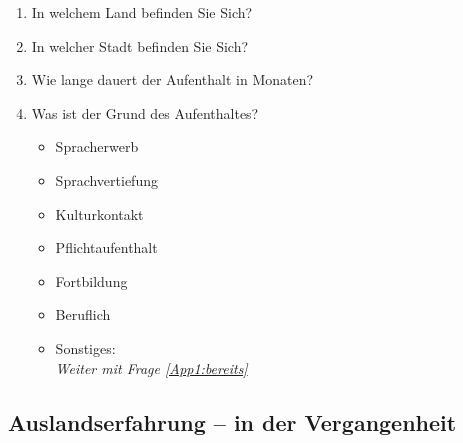 
\begin{enumerate}[resume]
\item In welchem Land befinden Sie Sich?\\\label{App1:ggnw}
	   \underline{\hspace{7.5cm}}


\item In welcher Stadt befinden Sie Sich?\\
	   \underline{\hspace{7.5cm}}


\item Wie lange dauert der Aufenthalt in Monaten?\\
	   \underline{\hspace{7.5cm}}
       
       
\item Was ist der Grund des Aufenthaltes?

		\begin{itemize}
		\item[\Circle] Spracherwerb 
        \item[\Circle] Sprachvertiefung 
        \item[\Circle] Kulturkontakt
        \item[\Circle] Pflichtaufenthalt
        \item[\Circle] Fortbildung
        \item[\Circle] Beruflich
        \item[\Circle] Sonstiges:~\underline{\hspace{7.5cm}}\\
        				\hspace{2cm} \textit{Weiter mit Frage \ref{App1:bereits}}
        \end{itemize}

\end{enumerate}

\subsection*{Auslandserfahrung -- in der Vergangenheit}


